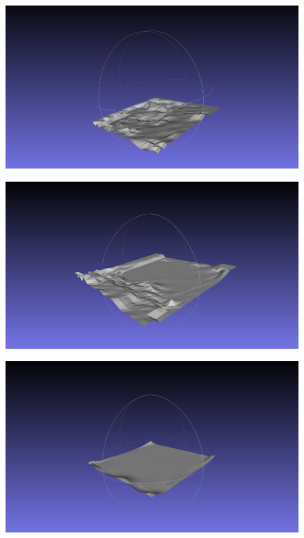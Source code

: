   \begin{figure}[htbp]
    \centering
    \begin{minipage}[b]{0.49\linewidth}
      \centering
      \includegraphics[keepaspectratio, scale=0.47]{images/spline1.png}
      \label{fig:spline1}
    \end{minipage}
    \begin{minipage}[b]{0.49\linewidth}
      \centering
      \includegraphics[keepaspectratio, scale=0.45]{images/spline2.png}
      \label{fig:spline2}
    \end{minipage}
    \begin{minipage}[b]{0.49\linewidth}
      \centering
      \includegraphics[keepaspectratio, scale=0.45]{images/spline3.png}

\end{minipage}
\end{figure}
